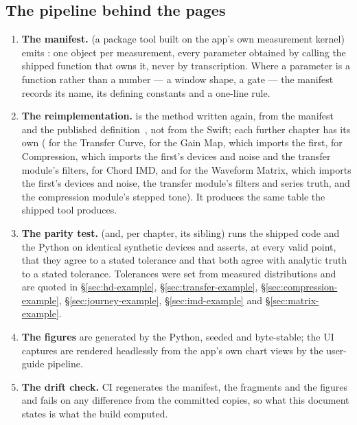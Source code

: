 \documentclass[11pt,a4paper]{article}
\begin{document}
\subsection{The pipeline behind the pages}
\begin{enumerate}
  \item \textbf{The manifest.}  (a package tool
  built on the app's own measurement kernel) emits
  : one object per measurement, every
  parameter obtained by calling the shipped function that owns it, never by
  transcription. Where a parameter is a function rather than a number --- a
  window shape, a gate --- the manifest records its name, its defining
  constants and a one-line rule.
  \item \textbf{The reimplementation.} 
  is the method written again, from the manifest and the published
  definition~\citep{farina2000,novak2015}, not from the Swift; each further
  chapter has its own ( for the Transfer Curve,
   for the Gain Map, which imports the first,
   for Compression, which imports the first's devices
  and noise and the transfer module's filters, 
  for Chord IMD, and  for the Waveform Matrix,
  which imports the first's devices and noise, the transfer module's
  filters and series truth, and the compression module's stepped tone).
  It produces the same table the shipped tool produces.
  \item \textbf{The parity test.}  (and, per
  chapter, its sibling) runs the shipped code and the Python on identical
  synthetic devices and asserts, at every valid point, that they agree to
  a stated tolerance and that both agree with analytic truth to a stated
  tolerance. Tolerances were set from measured distributions and are quoted
  in \S\ref{sec:hd-example}, \S\ref{sec:transfer-example},
  \S\ref{sec:compression-example}, \S\ref{sec:journey-example},
  \S\ref{sec:imd-example} and \S\ref{sec:matrix-example}.
  \item \textbf{The figures} are generated by the Python, seeded and
  byte-stable; the UI captures are rendered headlessly from the app's own
  chart views by the user-guide pipeline.
  \item \textbf{The drift check.} CI regenerates the manifest, the fragments
  and the figures and fails on any difference from the committed copies, so
  what this document states is what the build computed.
\end{enumerate}
\end{document}
